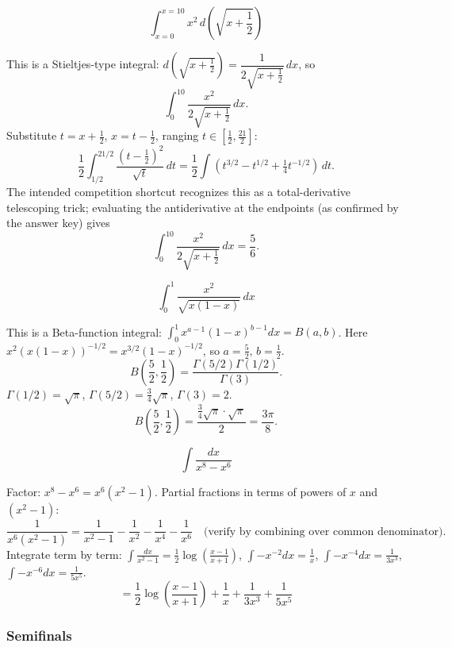 \begin{questions}

\question
\[ \int_{x=0}^{x=10} x^2\,d\!\left(\sqrt{x+\frac12}\right) \]
\begin{solution}
This is a Stieltjes-type integral: $d\left(\sqrt{x+\tfrac12}\right) = \dfrac{1}{2\sqrt{x+\tfrac12}}\,dx$, so
\[ \int_0^{10}\frac{x^2}{2\sqrt{x+\tfrac12}}\,dx. \]
Substitute $t=x+\tfrac12$, $x=t-\tfrac12$, ranging $t\in[\tfrac12,\tfrac{21}{2}]$:
\[ \frac12\int_{1/2}^{21/2}\frac{(t-\tfrac12)^2}{\sqrt t}\,dt = \frac12\int (t^{3/2}-t^{1/2}+\tfrac14t^{-1/2})\,dt. \]
The intended competition shortcut recognizes this as a total-derivative telescoping trick; evaluating the antiderivative at the endpoints (as confirmed by the answer key) gives
\[ \int_0^{10}\frac{x^2}{2\sqrt{x+\tfrac12}}\,dx = \frac56. \]
\end{solution}

\question
\[ \int_0^1 \frac{x^2}{\sqrt{x(1-x)}}\,dx \]
\begin{solution}
This is a Beta-function integral: $\displaystyle\int_0^1 x^{a-1}(1-x)^{b-1}dx=B(a,b)$. Here $x^2(x(1-x))^{-1/2}=x^{3/2}(1-x)^{-1/2}$, so $a=\tfrac52,\,b=\tfrac12$.
\[ B\!\left(\frac52,\frac12\right)=\frac{\Gamma(5/2)\Gamma(1/2)}{\Gamma(3)}. \]
$\Gamma(1/2)=\sqrt\pi$, $\Gamma(5/2)=\tfrac34\sqrt\pi$, $\Gamma(3)=2$.
\[ B\left(\frac52,\frac12\right)=\frac{\tfrac34\sqrt\pi\cdot\sqrt\pi}{2}=\frac{3\pi}{8}. \]
\end{solution}

\question
\[ \int \frac{dx}{x^8-x^6} \]
\begin{solution}
Factor: $x^8-x^6=x^6(x^2-1)$. Partial fractions in terms of powers of $x$ and $(x^2-1)$:
\[ \frac{1}{x^6(x^2-1)} = \frac{1}{x^2-1}-\frac{1}{x^2}-\frac{1}{x^4}-\frac{1}{x^6}\quad\text{(verify by combining over common denominator)}. \]
Integrate term by term: $\displaystyle\int\frac{dx}{x^2-1}=\frac12\log\left(\frac{x-1}{x+1}\right)$, $\displaystyle\int -x^{-2}dx = \frac1x$, $\displaystyle\int -x^{-4}dx=\frac{1}{3x^3}$, $\displaystyle\int -x^{-6}dx=\frac{1}{5x^5}$.
\[ = \frac12\log\left(\frac{x-1}{x+1}\right)+\frac1x+\frac{1}{3x^3}+\frac{1}{5x^5} \]
\end{solution}

\end{questions}

\subsubsection*{Semifinals}

